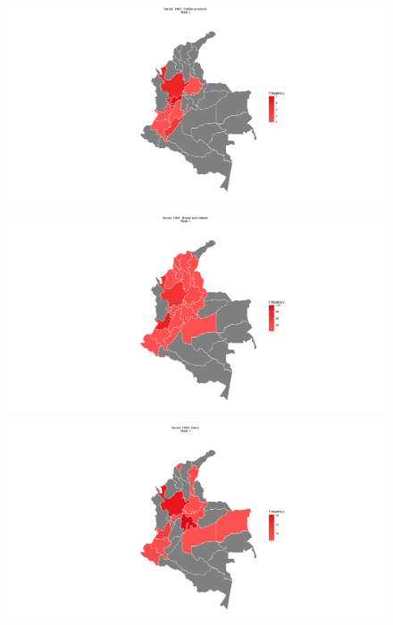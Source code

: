 \documentclass{beamer}
\begin{document}
	\begin{frame}[allowframebreaks]
		\begin{figure}
			\centering
			\includegraphics[scale=0.2]{coffee.png}
		\end{figure}
	\framebreak
		\begin{figure}
			\centering
			\includegraphics[scale=0.2]{bread.png}
		\end{figure}
	\framebreak
		\begin{figure}
			\centering
			\includegraphics[scale=0.2]{milk.png}
		\end{figure}
	\framebreak
		\begin{figure}

\end{figure}
\end{frame}
\end{document}
